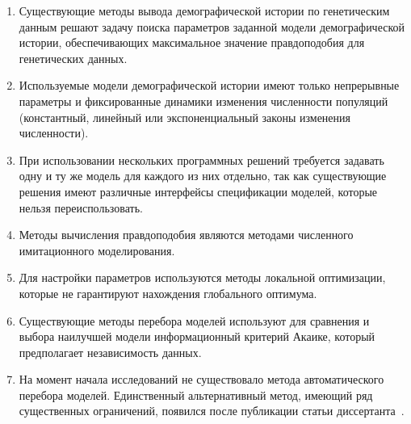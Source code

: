 \begin{enumerate}[label={\arabic*.}]
    \item Существующие методы вывода демографической истории по генетическим данным решают задачу поиска параметров заданной модели демографической истории, обеспечивающих максимальное значение правдоподобия для генетических данных.
    \item Используемые модели демографической истории имеют только непрерывные параметры и фиксированные динамики изменения численности популяций (константный, линейный или экспоненциальный законы изменения численности).
    \item При использовании нескольких программных решений требуется задавать одну и ту же модель для каждого из них отдельно, так как существующие решения имеют различные интерфейсы спецификации моделей, которые нельзя переиспользовать.
    \item Методы вычисления правдоподобия являются методами численного имитационного моделирования.
    \item Для настройки параметров используются методы локальной оптимизации, которые не гарантируют нахождения глобального оптимума.
    \item Существующие методы перебора моделей используют для сравнения и выбора наилучшей модели информационный критерий Акаике, который предполагает независимость данных.
    \item На момент начала исследований не существовало метода автоматического перебора моделей.
    Единственный альтернативный метод, имеющий ряд существенных ограничений, появился после публикации статьи диссертанта~\cite{noskova2020gadma}.
\end{enumerate}




